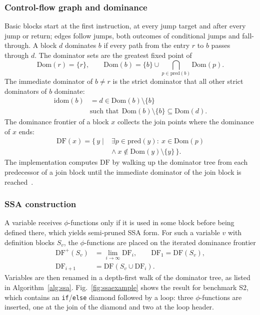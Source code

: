 \documentclass{ieeeaccess}
\begin{document}
\subsubsection{Control-flow graph and dominance}
Basic blocks start at the first instruction, at every jump target and after every jump or return; edges follow jumps, both outcomes of conditional jumps and fall-through. A block $d$ dominates $b$ if every path from the entry $r$ to $b$ passes through $d$. The dominator sets are the greatest fixed point of
\begin{equation}
\mathrm{Dom}(r)=\{r\},\qquad
\mathrm{Dom}(b)=\{b\}\cup\!\!\bigcap_{p\in \mathrm{pred}(b)}\!\!\mathrm{Dom}(p).
\label{eq:dom}
\end{equation}
The immediate dominator of $b\neq r$ is the strict dominator that all other strict dominators of $b$ dominate:
\begin{equation}
\begin{aligned}
\mathrm{idom}(b)&=d\in\mathrm{Dom}(b)\setminus\{b\}\\
&\text{such that}\ \ \mathrm{Dom}(b)\setminus\{b\}\subseteq \mathrm{Dom}(d).
\end{aligned}
\label{eq:idom}
\end{equation}
The dominance frontier of a block $x$ collects the join points where the dominance of $x$ ends:
\begin{equation}
\begin{aligned}
\mathrm{DF}(x)=\{\,y \mid{}& \exists p\in\mathrm{pred}(y):\ x\in\mathrm{Dom}(p)\\
&\wedge\ x\notin \mathrm{Dom}(y)\setminus\{y\}\,\}.
\end{aligned}
\label{eq:df}
\end{equation}
The implementation computes $\mathrm{DF}$ by walking up the dominator tree from each predecessor of a join block until the immediate dominator of the join block is reached~\cite{rastello2022ssa}.

\subsubsection{SSA construction}
A variable receives $\phi$-functions only if it is used in some block before being defined there, which yields semi-pruned SSA form. For such a variable $v$ with definition blocks $S_v$, the $\phi$-functions are placed on the iterated dominance frontier
\begin{equation}
\begin{aligned}
\mathrm{DF}^{+}(S_v)&=\lim_{i\to\infty}\mathrm{DF}_i,\qquad \mathrm{DF}_1=\mathrm{DF}(S_v),\\
\mathrm{DF}_{i+1}&=\mathrm{DF}(S_v\cup \mathrm{DF}_i).
\end{aligned}
\label{eq:idf}
\end{equation}
Variables are then renamed in a depth-first walk of the dominator tree, as listed in Algorithm~\ref{alg:ssa}. Fig.~\ref{fig:ssaexample} shows the result for benchmark S2, which contains an \texttt{if}/\texttt{else} diamond followed by a loop: three $\phi$-functions are inserted, one at the join of the diamond and two at the loop header.
\end{document}
